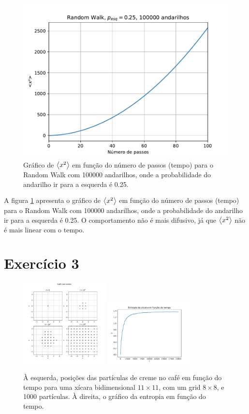 \documentclass[a4paper, brazil]{article}
\begin{document}
\begin{figure}[ht]
\centering
\includegraphics[width=\textwidth]{fig_2.pdf}
\caption{Gráfico de \( \expval{x^2} \) em função do número de passos (tempo) para o Random Walk com 100000 andarilhos, onde a probabilidade do andarilho ir para a esquerda é \num{0.25}.}\label{fig2}
\end{figure}

A figura \ref{fig2} apresenta o gráfico de \( \expval{x^2} \) em função do número de passos (tempo) para o Random Walk com 100000 andarilhos, onde a probabilidade do andarilho ir para a esquerda é \num{0.25}.
O comportamento não é mais difusivo, já que \( \expval{x^2} \) não é mais linear com o tempo.

\newpage
\section{Exercício 3}

\begin{figure}[ht]
\centering
\includegraphics[width=0.4\textwidth]{fig_3a.pdf}
\includegraphics[width=0.4\textwidth]{fig_3b.pdf}
\caption{À esquerda, posições das partículas de creme no café em função do tempo para uma xícara bidimensional \( 11 \times 11 \), com um grid \( 8 \times 8 \), e 1000 partículas. À direita, o gráfico da entropia em função do tempo.}\label{fig3}
\end{figure}
\end{document}
